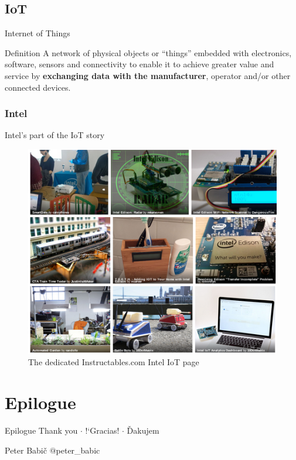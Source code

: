 \documentclass[hyperref={unicode}]{beamer}
\begin{document}
\subsection{IoT}

\begin{frame}{Internet of Things}
	\begin{block}{Definition}
	A network of physical objects or “things” embedded with electronics, software, sensors and connectivity to enable it to achieve greater value and service by \textbf{exchanging data with the manufacturer}, operator and/or other connected devices.
	\end{block}
\end{frame}

\subsubsection{Intel}

\begin{frame}{Intel's part of the IoT story}
	\begin{figure}
	\includegraphics[width=.7\textwidth]{intel-iot.png}
	\caption{The dedicated Instructables.com Intel IoT page}
	\end{figure}
\end{frame}

\section{Epilogue}

\begin{frame}{Epilogue}
	\centering
	{\large Thank you $\cdot$ !`Gracias! $\cdot$ Ďakujem}
	
	\vskip 2cm
	Peter Babič	$@$peter\_babic

\end{frame}


\end{document}
